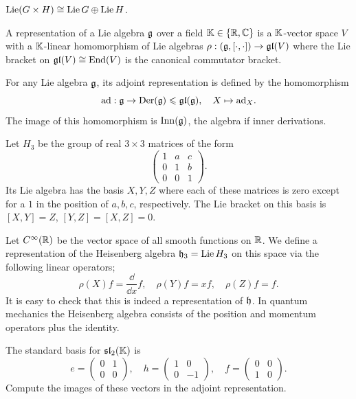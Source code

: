 \begin{example}
    $\operatorname{Lie} (G\times H)\cong \operatorname{Lie} G\oplus \operatorname{Lie} H$.
\end{example}


\begin{defn}
    A representation of a Lie algebra $\mathfrak{g}$ over a field $\mathbb{K}\in \{\mathbb{R},\mathbb{C}\}$ is a $\mathbb{K}$-vector space $V$ with a $\mathbb{K}$-linear homomorphism of Lie algebras $\rho:(\mathfrak{g},[\cdot,\cdot])\to \mathfrak{gl}(V)$ where the Lie bracket on $\mathfrak{gl}(V)\cong \operatorname{End}(V)$ is the canonical commutator bracket.
\end{defn}

\begin{defn}
    For any Lie algebra $\mathfrak{g}$, its adjoint representation is defined by the homomorphism
    \[\mathrm{ad}:\mathfrak{g}\to \operatorname{Der}(\mathfrak{g})\leqslant \mathfrak{gl}(\mathfrak{g}),\quad X\mapsto \mathrm{ad}_X.\]
    The image of this homomorphism is $\operatorname{Inn}(\mathfrak{g})$, the algebra if inner derivations.
\end{defn}


\begin{example}\label{example Heisenberg group}
    Let $H_3$ be the group of real $3\times 3$ matrices of the form
    \[\begin{pmatrix}
        1&a&c\\0&1&b\\0&0&1
    \end{pmatrix}.\]
    Its Lie algebra has the basis $X,Y,Z$ where each of these matrices is zero except for a $1$ in the position of $a,b,c$, respectively. The Lie bracket on this basis is $[X,Y]=Z$, $[Y,Z]=[X,Z]=0$.
    
    Let $C^\infty(\mathbb{R})$ be the vector space of all smooth functions on $\mathbb{R}$. We define a representation of the Heisenberg algebra $\mathfrak{h}_3=\operatorname{Lie}{H_3}$ on this space via the following linear operators;
    \[\rho(X)f=\frac{\dd}{\dd x}f,\quad \rho(Y)f=xf,\quad \rho(Z)f=f.\]
    It is easy to check that this is indeed a representation of $\mathfrak{h}$. In quantum mechanics the Heisenberg algebra consists of the position and momentum operators plus the identity.
\end{example}

\begin{xca}
    The standard basis for $\mathfrak{sl}_2(\mathbb{K})$ is 
    \[e=\begin{pmatrix}
        0&1\\0&0
    \end{pmatrix},\quad h=\begin{pmatrix}
        1&0\\0&-1
    \end{pmatrix},
    \quad f=\begin{pmatrix}
        0&0\\1&0
    \end{pmatrix}.\]
    Compute the images of these vectors in the adjoint representation.
\end{xca}

